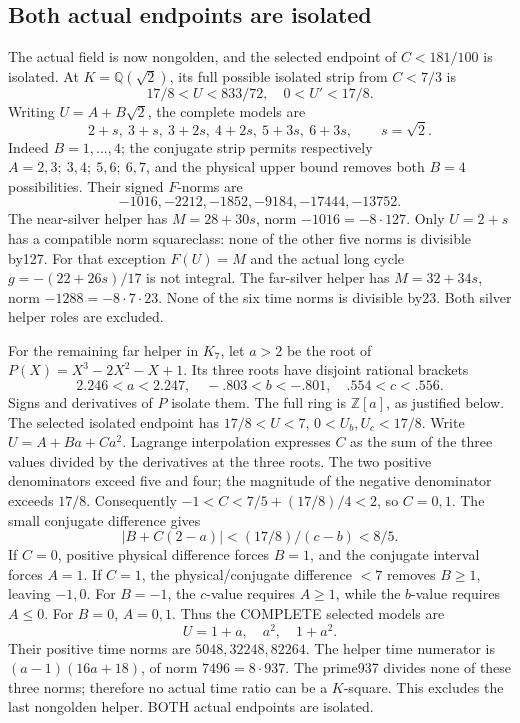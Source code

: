 \subsection{Both actual endpoints are isolated}
\label{app:arithA16helpers}

The actual field is now nongolden, and the selected endpoint
of \(C<181/100\) is isolated.
At \(K=\mathbb Q(\sqrt2)\), its full possible isolated strip
from \(C<7/3\) is
\[
 17/8<U<833/72,\quad0<U'<17/8 .
\]
Writing \(U=A+B\sqrt2\), the complete models are
\[
 2+s,\ 3+s,\ 3+2s,\ 4+2s,\ 5+3s,\ 6+3s,\qquad s=\sqrt2 .
\]
Indeed \(B=1,\ldots,4\);
the conjugate strip permits respectively
\(A=2,3;\ 3,4;\ 5,6;\ 6,7\), and the physical upper
bound removes both \(B=4\) possibilities.
Their signed \(F\)-norms are
\[
                   -1016,-2212,-1852,-9184,-17444,-13752 .
\]
The near-silver helper has \(M=28+30s\), norm
\(-1016=-8\cdot127\).
Only \(U=2+s\) has a compatible norm squareclass:
none of the other five norms is divisible by127.
For that exception \(F(U)=M\) and the actual long cycle
\(g=-(22+26s)/17\) is not integral.
The far-silver helper has \(M=32+34s\), norm
\(-1288=-8\cdot7\cdot23\).
None of the six time norms is divisible by23.
Both silver helper roles are excluded.

For the remaining far helper in \(K_7\), let \(a>2\) be
the root of \(P(X)=X^3-2X^2-X+1\).
Its three roots have disjoint rational brackets
\[
 2.246<a<2.247,\quad -.803<b<-.801,\quad .554<c<.556 .
\]
Signs and derivatives of \(P\) isolate them.
The full ring is \(\mathbb Z[a]\), as justified below.
The selected isolated endpoint has
\(17/8<U<7\), \(0<U_b,U_c<17/8\).
Write \(U=A+Ba+Ca^2\).
Lagrange interpolation expresses \(C\) as the sum of the
three values divided by the derivatives at the three roots.
The two positive denominators exceed five and four;
the magnitude of the negative denominator exceeds \(17/8\).
Consequently \(-1<C<7/5+(17/8)/4<2\), so \(C=0,1\).
The small conjugate difference gives
\[
                 |B+C(2-a)|<(17/8)/(c-b)<8/5 .
\]
If \(C=0\), positive physical difference forces \(B=1\),
and the conjugate interval forces \(A=1\).
If \(C=1\), the physical/conjugate difference \(<7\)
removes \(B\ge1\), leaving \(-1,0\).
For \(B=-1\), the \(c\)-value requires \(A\ge1\), while
the \(b\)-value requires \(A\le0\).
For \(B=0\), \(A=0,1\).
Thus the COMPLETE selected models are
\[
                               U=1+a,\quad a^2,\quad1+a^2 .
\]
Their positive time norms are \(5048,32248,82264\).
The helper time numerator is
\((a-1)(16a+18)\), of norm \(7496=8\cdot937\).
The prime937 divides none of these three norms;
therefore no actual time ratio can be a \(K\)-square.
This excludes the last nongolden helper.
BOTH actual endpoints are isolated.

